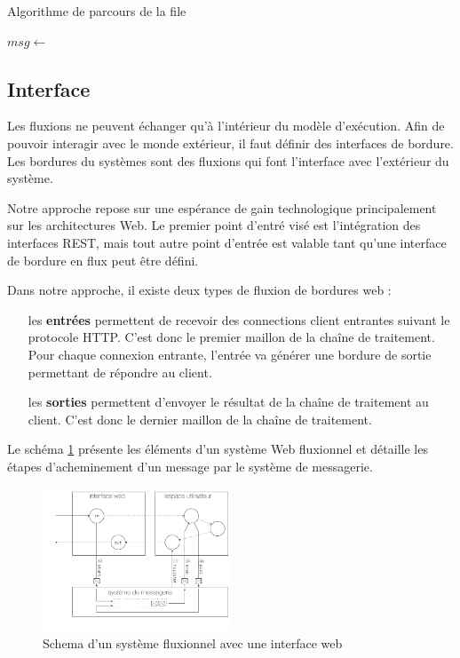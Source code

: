 \begin{algorithm}
\caption{Algorithme de parcours de la file}
\label{alg:parcours}
\begin{algorithmic}
\State $msg \gets$ 
\State {}
\EndWhile
\EndFunction
\end{algorithmic}
\end{algorithm}

\subsection{Interface}

Les fluxions ne peuvent échanger qu'à l'intérieur du modèle d'exécution.
Afin de pouvoir interagir avec le monde extérieur, il faut définir des interfaces de bordure.
Les bordures du systèmes sont des fluxions qui font l'interface avec l'extérieur du système.

Notre approche repose sur une espérance de gain technologique principalement sur les architectures Web.
Le premier point d'entré visé est l'intégration des interfaces REST, mais tout autre point d'entrée est valable tant qu'une interface de bordure en flux peut être défini.

Dans notre approche, il existe deux types de fluxion de bordures web :

\begin{itemize}
	\item[les \textbf{entrées}]
    permettent de recevoir des connections client entrantes suivant le protocole HTTP.
    C'est donc le premier maillon de la chaîne de traitement.
    Pour chaque connexion entrante, l'entrée va générer une bordure de sortie permettant de répondre au client.
	\item[les \textbf{sorties}]
    permettent d'envoyer le résultat de la chaîne de traitement au client.
    C'est donc le dernier maillon de la chaîne de traitement.
\end{itemize}


Le schéma \ref{fig:schemaweb} présente les éléments d'un système Web fluxionnel et détaille les étapes d'acheminement d'un message par le système de messagerie.

\begin{figure}[h!]
	\includegraphics[width=0.5\textwidth]{schema-web.pdf}
	\caption{Schema d'un système fluxionnel avec une interface web}
	\label{fig:schemaweb}
\end{figure}

